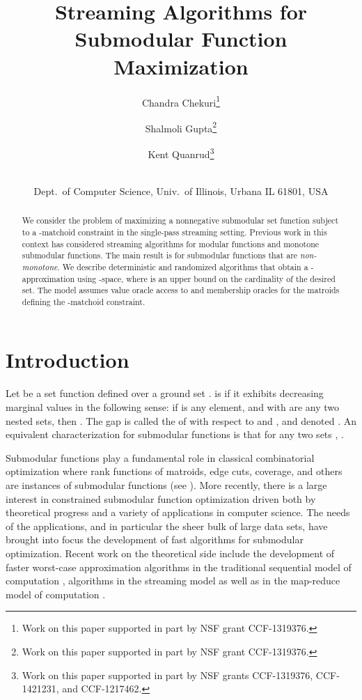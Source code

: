 \documentclass[oneside,letterpaper]{scrartcl} \usepackage{macros}
\begin{document}
\title{Streaming Algorithms for \\Submodular Function Maximization} \author{ Chandra Chekuri\thanks{ Work on this paper supported in part by NSF grant
    CCF-1319376.  } \and Shalmoli Gupta\thanks{Work on this paper supported in part by NSF grant
    CCF-1319376.  }\and Kent Quanrud\thanks{Work on this paper supported in part by NSF grants CCF-1319376,
    CCF-1421231, and CCF-1217462.  } \and
  \\
  Dept.\ of Computer Science, Univ.\ of Illinois, Urbana IL 61801, USA \\
   } 

\maketitle

\begin{abstract}
  We consider the problem of maximizing a nonnegative submodular set
  function  subject to a
  -matchoid constraint in the single-pass streaming
  setting. Previous work in this context has considered streaming
  algorithms for modular functions and monotone submodular
  functions. The main result is for submodular functions that are {\em
    non-monotone}. We describe deterministic and randomized algorithms
  that obtain a -approximation using -space, where  is an upper bound on the cardinality of the
  desired set. The model assumes value oracle access to  and
  membership oracles for the matroids defining the -matchoid
  constraint.
\end{abstract}

\section{Introduction}


Let  be a set function defined
over a ground set .  is  if it
exhibits decreasing marginal values in the following sense: if  is any element, and  with  are any two nested sets, then . The gap  is called the  of  with respect to  and , and denoted . An
equivalent characterization for submodular functions is that for any
two sets , . 

Submodular functions play a fundamental role in classical
combinatorial optimization where rank functions of matroids, edge
cuts, coverage, and others are instances of submodular functions (see
\cite{Schrijver_book,Fujishige_book}). More recently, there is a large
interest in constrained submodular function optimization driven both
by theoretical progress and a variety of applications in computer
science. The needs of the applications, and in particular the sheer
bulk of large data sets, have brought into focus the development of
fast algorithms for submodular optimization. Recent work on the
theoretical side include the development of faster worst-case
approximation algorithms in the traditional sequential model of
computation \cite{bv-famsf-14,ijbICML-13,ChekuriTV15}, algorithms in
the streaming model \cite{bmkk-sso-14,ck-smms-14} as well as in the
map-reduce model of computation \cite{kmvv-13}.
\end{document}
